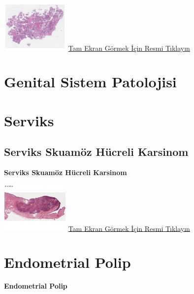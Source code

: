 \documentclass[
  letterpaper,
  DIV=11,
  numbers=noendperiod]{scrreprt}
\begin{document}
\href{https://images.patolojiatlasi.com/ovarianserousmicropapillary/HE.html}{\includegraphics[width=0.25\textwidth,height=\textheight]{./screenshots/ovarianserousmicropapillary_screenshot.png}}
\href{https://images.patolojiatlasi.com/ovarianserousmicropapillary/HE.html}{Tam
Ekran Görmek İçin Resmi Tıklayın}

\hypertarget{sec-genital-sistem-patolojisi}{%
\chapter{Genital Sistem
Patolojisi}\label{sec-genital-sistem-patolojisi}}

\hypertarget{sec-serviks}{%
\chapter{Serviks}\label{sec-serviks}}

\hypertarget{sec-serviks-skuamoz-hucreli-karsinom}{%
\section{Serviks Skuamöz Hücreli
Karsinom}\label{sec-serviks-skuamoz-hucreli-karsinom}}

\textbf{Serviks Skuamöz Hücreli Karsinom}

\href{https://images.patolojiatlasi.com/cervix-SCC/HE.html}{\includegraphics[width=0.25\textwidth,height=\textheight]{./screenshots/cervix-SCC_screenshot.png}}
\href{https://images.patolojiatlasi.com/cervix-SCC/HE.html}{Tam Ekran
Görmek İçin Resmi Tıklayın}

\hypertarget{sec-endometrial-polip}{%
\chapter{Endometrial Polip}\label{sec-endometrial-polip}}

\textbf{Endometrial Polip}
\end{document}
